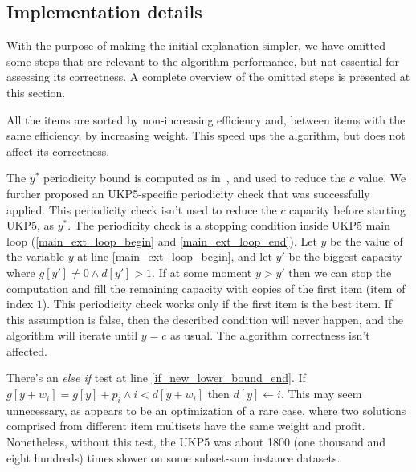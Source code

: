 \documentclass[runningheads,a4paper]{llncs}
\begin{document}
\subsection{Implementation details}

With the purpose of making the initial explanation simpler, we have omitted some steps that are relevant to the algorithm performance, but not essential for assessing its correctness. 
A complete overview of the omitted steps is presented at this section.

All the items are sorted by non-increasing efficiency and, between items with the same efficiency, by increasing weight. 
This speed ups the algorithm, but does not affect its correctness.

The \(y^{*}\) periodicity bound is computed as in~\cite[p. 223]{gar72}, and used to reduce the \(c\) value. 
We further proposed an UKP5-specific periodicity check that was successfully applied. 
This periodicity check isn't used to reduce the \(c\) capacity before starting UKP5, as \(y^{*}\). 
The periodicity check is a stopping condition inside UKP5 main loop (\ref{main_ext_loop_begin} and \ref{main_ext_loop_end}). 
Let \(y\) be the value of the variable \(y\) at line \ref{main_ext_loop_begin}, and let \(y'\) be the biggest capacity where \(g[y'] \neq 0 \land d[y'] > 1\). 
If at some moment \(y > y'\) then we can stop the computation and fill the remaining capacity with copies of the first item (item of index \(1\)).
This periodicity check works only if the first item is the best item. 
If this assumption is false, then the described condition will never happen, and the algorithm will iterate until \(y = c\) as usual. The algorithm correctness isn't affected.

There's an \emph{else if} test at line \ref{if_new_lower_bound_end}. 
If \(g[y + w_i] = g[y] + p_i \land i < d[y + w_i]\) then \(d[y] \gets i\). 
This may seem unnecessary, as appears to be an optimization of a rare case, where two solutions comprised from different item multisets have the same weight and profit. 
Nonetheless, without this test, the UKP5 was about 1800 (one thousand and eight hundreds) times slower on some subset-sum instance datasets.
\end{document}
